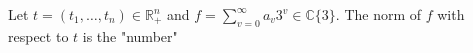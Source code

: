 Let $t = (t_1, \ldots, t_n) \in \mathbb{R}_+^n$ and $f = \sum_{v=0}^{\infty} a_v 3^v \in \mathbb{C}\{3\}$. The norm of $f$ with respect to $t$ is the "number"
